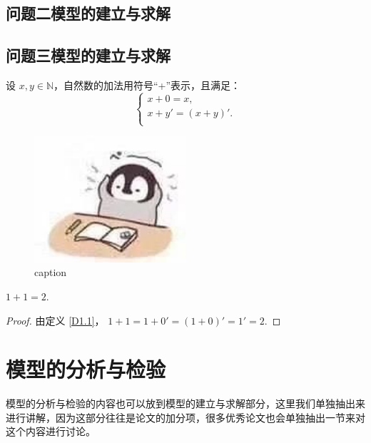 \subsection{问题二模型的建立与求解}

\subsection{问题三模型的建立与求解}

\begin{defn}\label{D1.1}
	设 $ x,y \in \mathbb{N} $，自然数的加法用符号“+”表示，且满足：
	\[ \left\{ \begin{array}{l}
		x+0 = x, \\
		x+y' = (x+y)'. \\
	\end{array} \right. \]
\end{defn}

\begin{figure}
	\centering
	\includegraphics[width=0.5\textwidth]{figure/no_homework}
	\caption{caption}
\end{figure}

\begin{thm}[定理名]
	$ 1+1 = 2 $.
\end{thm}

\begin{proof}
	由定义 \ref{D1.1}，
	$ 1+1 = 1+0' = (1+0)' = 1' = 2 $.
\end{proof}

\section{模型的分析与检验}

模型的分析与检验的内容也可以放到模型的建立与求解部分，这里我们单独抽出来进行讲解，因为这部分往往是论文的加分项，很多优秀论文也会单独抽出一节来对这个内容进行讨论。

